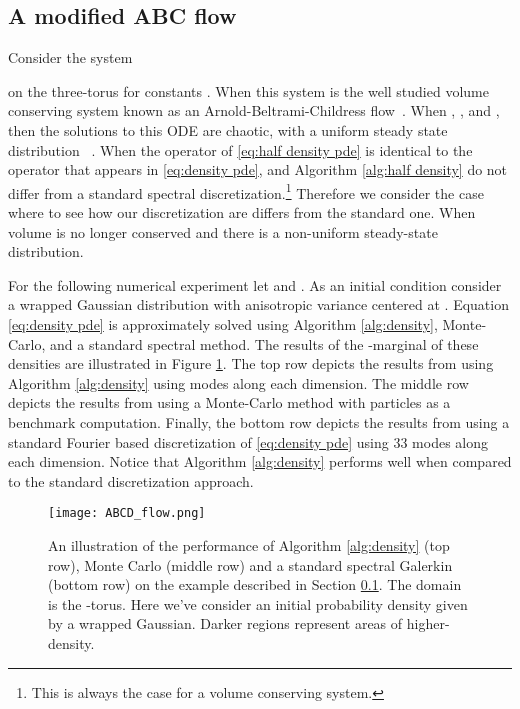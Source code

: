 \documentclass[final,leqno]{amsart}
\begin{document}
\subsection{A modified ABC flow}
\label{sec:ABC_flow}

Consider the system

on the three-torus for constants .  
When  this system is the well studied volume conserving system known as an Arnold-Beltrami-Childress flow~\cite{ArnoldKhesin1992}.
When , , and , then the solutions to this ODE are chaotic, with a uniform steady state distribution ~\cite{MajdaBertozzi2002}.
When  the operator  of \eqref{eq:half density pde} is identical to the operator  that appears in \eqref{eq:density pde}, and Algorithm \ref{alg:half density} do not differ from a standard spectral discretization.\footnote{This is always the case for a volume conserving system.}
Therefore we consider the case where  to see how our discretization are differs from the standard one.
When  volume is no longer conserved and there is a non-uniform steady-state distribution.

For the following numerical experiment let  and .
As an initial condition consider a wrapped Gaussian distribution with anisotropic variance  centered at .
Equation \eqref{eq:density pde} is approximately solved using Algorithm \ref{alg:density}, Monte-Carlo, and a standard spectral method.
The results of the -marginal of these densities are illustrated in Figure \ref{fig:ABCD}.
The top row depicts the results from using Algorithm \ref{alg:density} using  modes along each dimension.
The middle row depicts the results from using a Monte-Carlo method with  particles as a benchmark computation.
Finally, the bottom row depicts the results from using a standard Fourier based discretization of \eqref{eq:density pde} using 33 modes along each dimension.
Notice that Algorithm \ref{alg:density} performs well when compared to the standard discretization approach.

\begin{figure}[h!]
	\centering
	\texttt{[image: ABCD\_flow.png]}
	\caption{An illustration of the performance of Algorithm \ref{alg:density} (top row), Monte Carlo (middle row) and a standard spectral Galerkin (bottom row) on the example described in Section \ref{sec:ABC_flow}.
	The domain is the -torus.  Here we've consider an initial probability density given by a wrapped Gaussian. Darker regions represent areas of higher-density.}
	\label{fig:ABCD}
\end{figure}
\end{document}
